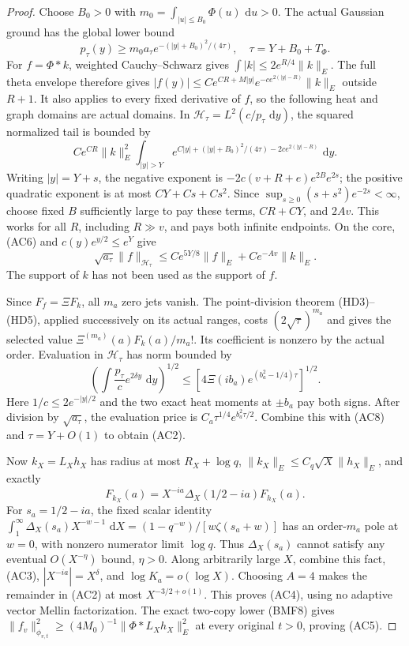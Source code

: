 \documentclass[11pt]{article}
\theoremstyle{remark}\newtheorem{remark}[theorem]{Remark}
\newcommand{\dd}{\,\mathrm d}
\begin{document}
\begin{proof}
Choose \(B_0>0\) with \(m_0=\int_{|u|\le B_0}\Phi(u)\,\dd u>0\).
The actual Gaussian ground has the global lower bound
\[
 p_\tau(y)\ge m_0a_\tau e^{-(|y|+B_0)^2/(4\tau)},
 \quad\tau=Y+B_0+T_\Phi .                               \tag{AC6}
\]
For \(f=\Phi*k\), weighted Cauchy--Schwarz gives
\(\int|k|\le2e^{R/4}\|k\|_E\). The full theta envelope therefore gives
\(|f(y)|\le Ce^{CR+M|y|}e^{-ce^{2(|y|-R)}}\|k\|_E\) outside \(R+1\).
It also applies to every fixed derivative of \(f\), so the following
heat and graph domains are actual domains. In
\(\mathcal H_\tau=L^2(c/p_\tau\,\dd y)\), the squared normalized tail
is bounded by
\[
 Ce^{CR}\|k\|_E^2\int_{|y|>Y}
  e^{C|y|+(|y|+B_0)^2/(4\tau)-2ce^{2(|y|-R)}}\,\dd y.
                                                               \tag{AC7}
\]
Writing \(|y|=Y+s\), the negative exponent is
\(-2c(v+R+e)e^{2B}e^{2s}\); the positive quadratic exponent is at
most \(CY+Cs+Cs^2\). Since \(\sup_{s\ge0}(s+s^2)e^{-2s}<\infty\),
choose fixed \(B\) sufficiently large to pay these terms, \(CR+CY\),
and \(2Av\). This works for all \(R\), including \(R\gg v\), and
pays both infinite endpoints. On the core, (AC6) and
\(c(y)e^{y/2}\le e^Y\) give
\[
 \sqrt{a_\tau}\|f\|_{\mathcal H_\tau}
   \le Ce^{5Y/8}\|f\|_E+Ce^{-Av}\|k\|_E .                \tag{AC8}
\]
The support of \(k\) has not been used as the support of \(f\).

Since \(F_f=\Xi F_k\), all \(m_a\) zero jets vanish. The point-division
theorem (HD3)--(HD5), applied successively on its actual ranges, costs
\((2\sqrt\tau)^{m_a}\) and gives the selected value
\(\Xi^{(m_a)}(a)F_k(a)/m_a!\). Its coefficient is nonzero by the
actual order. Evaluation in \(\mathcal H_\tau\) has norm bounded by
\[
 \left(\int\frac{p_\tau}{c}e^{2\delta y}\,\dd y\right)^{1/2}
   \le[4\Xi(ib_a)e^{(b_a^2-1/4)\tau}]^{1/2}.
\]
Here \(1/c\le2e^{-|y|/2}\) and the two exact heat moments at
\(\pm b_a\) pay both signs. After division by \(\sqrt{a_\tau}\),
the evaluation price is \(C_a\tau^{1/4}e^{b_a^2\tau/2}\).
Combine this with (AC8) and \(\tau=Y+O(1)\) to obtain (AC2).

Now \(k_X=L_Xh_X\) has radius at most \(R_X+\log q\),
\(\|k_X\|_E\le C_q\sqrt X\|h_X\|_E\), and exactly
\[
 F_{k_X}(a)=X^{-ia}\Delta_X(1/2-ia)F_{h_X}(a).             \tag{AC9}
\]
For \(s_a=1/2-ia\), the fixed scalar identity
\(\int_1^\infty\Delta_X(s_a)X^{-w-1}\,\dd X
 =(1-q^{-w})/[w\zeta(s_a+w)]\)
has an order-\(m_a\) pole at \(w=0\), with nonzero numerator limit
\(\log q\). Thus \(\Delta_X(s_a)\) cannot satisfy any eventual
\(O(X^{-\eta})\) bound, \(\eta>0\). Along arbitrarily large \(X\),
combine this fact, (AC3), \(|X^{-ia}|=X^\delta\), and
\(\log K_a=o(\log X)\). Choosing \(A=4\) makes the remainder in
(AC2) at most \(X^{-3/2+o(1)}\). This proves (AC4), using no adaptive
vector Mellin factorization. The exact two-copy lower (BMF8) gives
\(\|f_v\|_{\phi_{v,t}}^2\ge(4M_0)^{-1}\|\Phi*L_Xh_X\|_E^2\)
at every original \(t>0\), proving (AC5).


\end{proof}
\end{document}
